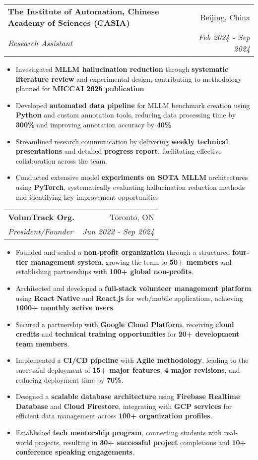 \documentclass[letterpaper,10pt]{article}
\makeatletter
\newcommand{\resumeItem}[1]{
  \item\small{
    {#1 \vspace{-5pt}}
  }
}
\newcommand{\resumeSubheading}[4]{
  \vspace{-2pt}\item
    \begin{tabular*}{0.97\textwidth}[t]{l@{\extracolsep{\fill}}r}
      \textbf{#1} & #2 \\
      \textit{\small#3} & \textit{\small #4} \\
    \end{tabular*}\vspace{-7pt}
}
\newcommand{\resumeItemListStart}{\begin{itemize}}
\newcommand{\resumeItemListEnd}{\end{itemize}\vspace{-5pt}}
\makeatother
\begin{document}
\resumeSubheading
  {The Institute of Automation, Chinese Academy of Sciences (CASIA) }{Beijing, China}
  {Research Assistant}{Feb 2024 - Sep 2024}
  \resumeItemListStart
    \resumeItem{Investigated \textbf{MLLM hallucination reduction} through \textbf{systematic literature review} and experimental design, contributing to methodology planned for \textbf{MICCAI 2025 publication}}
    \resumeItem{Developed \textbf{automated data pipeline} for MLLM benchmark creation using \textbf{Python} and custom annotation tools, reducing data processing time by \textbf{300\%} and improving annotation accuracy by \textbf{40\%}}
    \resumeItem{Streamlined research communication by delivering \textbf{weekly technical presentations} and detailed \textbf{progress report}, facilitating effective collaboration across the team.}
    \resumeItem{Conducted extensive model \textbf{experiments on SOTA MLLM} architectures using \textbf{PyTorch}, systematically evaluating hallucination reduction methods and identifying key improvement opportunities}
  \resumeItemListEnd

  \resumeSubheading
  {VolunTrack Org.}{Toronto, ON}
  {President/Founder}{Jun 2022 - Sep 2024}
  \resumeItemListStart
    \resumeItem{Founded and scaled a \textbf{non-profit organization} through a structured \textbf{four-tier management system}, growing the team to \textbf{50+ members} and establishing partnerships with \textbf{100+ global non-profits}.}
    \resumeItem{Architected and developed a \textbf{full-stack volunteer management platform} using \textbf{React Native} and \textbf{React.js} for web/mobile applications, achieving \textbf{1000+ monthly active users}.}
    \resumeItem{Secured a partnership with \textbf{Google Cloud Platform}, receiving \textbf{cloud credits} and \textbf{technical training opportunities} for \textbf{20+ development team members}.}
    \resumeItem{Implemented a \textbf{CI/CD pipeline} with \textbf{Agile methodology}, leading to the successful deployment of \textbf{15+ major features}, \textbf{4 major revisions}, and reducing deployment time by \textbf{70\%}.}
    \resumeItem{Designed a \textbf{scalable database architecture} using \textbf{Firebase Realtime Database} and \textbf{Cloud Firestore}, integrating with \textbf{GCP services} for efficient data management across \textbf{100+ organization profiles}.}
    \resumeItem{Established \textbf{tech mentorship program}, connecting students with real-world projects, resulting in \textbf{30+ successful project} completions and \textbf{10+ conference speaking engagements}.}
  \resumeItemListEnd
\end{document}
